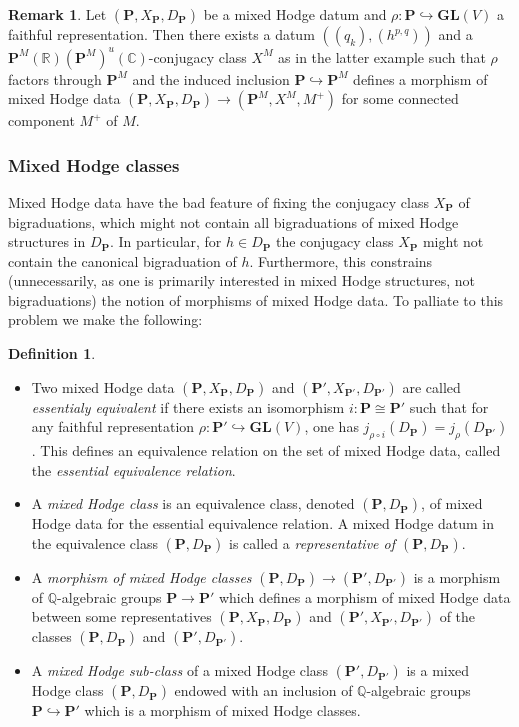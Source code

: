 \documentclass[10pt]{article}
\numberwithin{equation}{subsection}
\theoremstyle{plain}
\theoremstyle{definition}
\newtheorem{definition}[theorem]{Definition}
\newtheorem{remark}[theorem]{Remark}
\theoremstyle{remark}
\newcommand{\Q}{\mathbb Q}
\newcommand{\C}{\mathbb C}
\newcommand{\R}{\mathbb R}
\newcommand{\pp}{\mathbf P}
\newcommand{\gl}{\mathbf{GL}}
\begin{document}
\begin{remark}
Let $(\pp, X_\pp, D_\pp)$ be a mixed Hodge datum and $\rho : \pp \hookrightarrow \gl(V)$ a faithful representation. Then there exists a datum $((q_k), (h^{p,q}))$ and a $\pp^M(\R)(\pp^M)^u(\C)$-conjugacy class $X^M$ as in the latter example such that $\rho$ factors through $\pp^M$ and the induced inclusion $\pp \hookrightarrow \pp^M$ defines a morphism of mixed Hodge data $(\pp, X_\pp, D_\pp) \rightarrow (\pp^M, X^M, M^+)$ for some connected component $M^+$ of $M$.
\end{remark}
\subsubsection*{Mixed Hodge classes}
Mixed Hodge data have the bad feature of fixing the conjugacy class $X_\pp$ of bigraduations, which might not contain all bigraduations of mixed Hodge structures in $D_\pp$. In particular, for $h \in D_\pp$ the conjugacy class $X_\pp$ might not contain the canonical bigraduation of $h$. Furthermore, this constrains (unnecessarily, as one is primarily interested in mixed Hodge structures, not bigraduations) the notion of morphisms of mixed Hodge data. To palliate to this problem we make the following:
\begin{definition}
\begin{itemize}
\item[(a)] Two mixed Hodge data $(\pp, X_\pp, D_\pp)$ and $(\pp',X_{\pp'}, D_{\pp'})$ are called \textit{essentialy equivalent} if there exists an isomorphism $i : \pp \cong \pp'$ such that for any faithful representation $\rho : \pp' \hookrightarrow \gl(V)$, one has $j_{\rho \circ i}(D_\pp) = j_\rho(D_{\pp'})$. This defines an equivalence relation on the set of mixed Hodge data, called the \textit{essential equivalence relation}.
\item[(b)] A \textit{mixed Hodge class} is an equivalence class, denoted $(\pp,D_\pp)$, of mixed Hodge data for the essential equivalence relation. A mixed Hodge datum in the equivalence class $(\pp, D_\pp)$ is called a \textit{representative of $(\pp, D_\pp)$}.
\item[(c)] A \textit{morphism of mixed Hodge classes} $(\pp, D_\pp) \rightarrow (\pp', D_{\pp'})$ is a morphism of $\Q$-algebraic groups $\pp \rightarrow \pp'$ which defines a morphism of mixed Hodge data between some representatives $(\pp, X_\pp, D_\pp)$ and $(\pp', X_{\pp'}, D_{\pp'})$ of the classes $(\pp, D_\pp)$ and $(\pp', D_{\pp'})$.
\item[(d)] A \textit{mixed Hodge sub-class} of a mixed Hodge class $(\pp', D_{\pp'})$ is a mixed Hodge class $(\pp,D_\pp)$ endowed with an inclusion of $\Q$-algebraic groups $\pp \hookrightarrow \pp'$ which is a morphism of mixed Hodge classes.
\end{itemize}
\end{definition}
\end{document}
